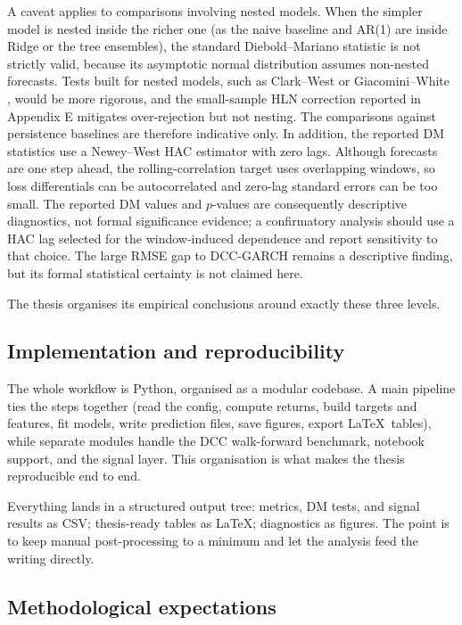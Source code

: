 A caveat applies to comparisons involving nested models. When the simpler model is nested inside the richer one (as the naive baseline and AR(1) are inside Ridge or the tree ensembles), the standard Diebold--Mariano statistic is not strictly valid, because its asymptotic normal distribution assumes non-nested forecasts. Tests built for nested models, such as Clark--West or Giacomini--White \cite{clark2007nested,giacomini2006tests}, would be more rigorous, and the small-sample HLN correction reported in Appendix E mitigates over-rejection but not nesting. The comparisons against persistence baselines are therefore indicative only. In addition, the reported DM statistics use a Newey--West HAC estimator with zero lags. Although forecasts are one step ahead, the rolling-correlation target uses overlapping windows, so loss differentials can be autocorrelated and zero-lag standard errors can be too small. The reported DM values and $p$-values are consequently descriptive diagnostics, not formal significance evidence; a confirmatory analysis should use a HAC lag selected for the window-induced dependence and report sensitivity to that choice. The large RMSE gap to DCC-GARCH remains a descriptive finding, but its formal statistical certainty is not claimed here.

The thesis organises its empirical conclusions around exactly these three levels.

\subsection{Implementation and reproducibility}

The whole workflow is Python, organised as a modular codebase. A main pipeline ties the steps together (read the config, compute returns, build targets and features, fit models, write prediction files, save figures, export \LaTeX\ tables), while separate modules handle the DCC walk-forward benchmark, notebook support, and the signal layer. This organisation is what makes the thesis reproducible end to end.

Everything lands in a structured output tree: metrics, DM tests, and signal results as CSV; thesis-ready tables as \LaTeX; diagnostics as figures. The point is to keep manual post-processing to a minimum and let the analysis feed the writing directly.

\subsection{Methodological expectations}

